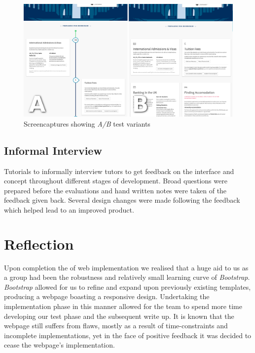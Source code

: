 \documentclass[a4paper, notoc]{tufte-handout}
\begin{document}
\begin{figure}
  \includegraphics{abtest.png}
  \caption{
    \label{fig:abtest}
    Screencaptures showing \textit{A/B} test variants
  }

\end{figure}

\subsection{Informal Interview}\label{subsec:interview}


Tutorials to informally interview tutors to get feedback on the interface and concept throughout different stages of development. Broad questions were prepared before the evaluations and hand written notes were taken of the feedback given back. Several design changes were made following the feedback which helped lead to an improved product.

\section{Reflection}


Upon completion the of web implementation we realised that a huge aid to us as a group had been the robustness and relatively small learning curve of \textit{Bootstrap}. \textit{Bootstrap} allowed for us to refine and expand upon previously existing templates, producing a webpage boasting a responsive design. Undertaking the implementation phase in this manner allowed for the team to spend more time developing our test phase and the subsequent write up. It is known that the webpage still suffers from flaws, mostly as a result of time-constraints and incomplete implementations, yet in the face of positive feedback it was decided to cease the webpage's implementation.
\end{document}
